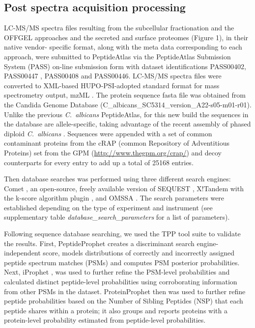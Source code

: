 \subsection*{Post spectra acquisition processing}

LC-MS/MS spectra files resulting from the subcellular fractionation and the OFFGEL
approaches and the secreted and surface proteomes (Figure 1), in their native vendor-
specific format, along with the meta data corresponding to each approach, were submitted to
PeptideAtlas via the PeptideAtlas Submission System (PASS) on-line submission form with
dataset identifications PASS00402, PASS00447 , PASS00408 and PASS00446. LC-MS/MS
spectra files were converted to XML-based HUPO-PSI-adopted standard format for mass
spectrometry output, mzML \citep{Martens2011}. The protein sequence fasta file was obtained from the
Candida Genome Database  (C\_albicans\_SC5314\_version\_A22-s05-m01-r01). Unlike the
previous \textit{\mbox{C. albicans}} PeptideAtlas, for this new build the sequences in the database are
allele-specific, taking advantage of the recent assembly of phased diploid \textit{\mbox{C. albicans}} \citep{Muzzey2013}.
Sequences were appended with a set of common contaminant proteins from the cRAP
(common Repository of Adventitious Proteins) set from the GPM \linebreak 
(\href{http://www.thegpm.org/crap/}{http://www.thegpm.org/crap/}) 
and decoy counterparts for every entry to add up a total of 25168 entries.

Then database searches was performed using three different search engines: Comet \citep{Eng2013},
an open-source, freely available version of SEQUEST \citep{Eng1994}, X!Tandem \citep{Craig2004} with the k-score
algorithm plugin \citep{MacLean2006}, and OMSSA \citep{Geer2004}. The search parameters were established depending
on the type of experiment and instrument (see supplementary table \textit{database\_search\_parameters} for a list of parameters).

Following sequence database searching, we used the TPP tool suite to validate the results.
First, PeptideProphet \citep{Keller2002} creates a discriminant search engine-independent score, models
distributions of correctly and incorrectly assigned peptide spectrum matches (PSMs) and
computes PSM posterior probabilities. Next, iProphet \citep{Shteynberg2011}, was used to further refine the
PSM-level probabilities and calculated distinct peptide-level probabilities using corroborating
information from other PSMs in the dataset. ProteinProphet \citep{Nesvizhskii2003} then was used to further
refine peptide probabilities based on the Number of Sibling Peptides (NSP) that each peptide
shares within a protein; it also groups and reports proteins with a protein-level probability
estimated from peptide-level probabilities.

